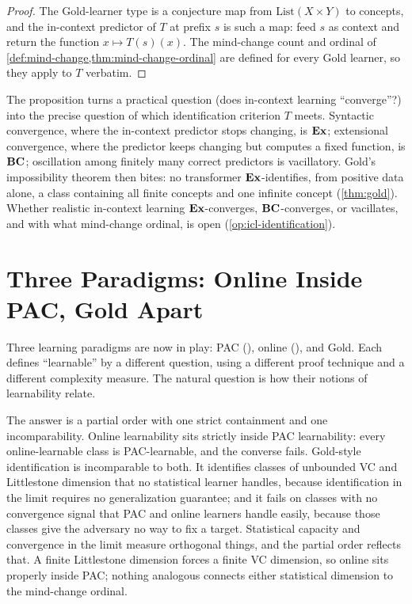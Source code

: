 \begin{proof}
The Gold-learner type is a conjecture map from $\mathrm{List}(X \times Y)$ to concepts, and the in-context predictor of $T$ at prefix $s$ is such a map: feed $s$ as context and return the function $x \mapsto T(s)(x)$.  The mind-change count and ordinal of \cref{def:mind-change,thm:mind-change-ordinal} are defined for every Gold learner, so they apply to $T$ verbatim.
\end{proof}

The proposition turns a practical question (does in-context learning ``converge''?) into the precise question of which identification criterion $T$ meets.  Syntactic convergence, where the in-context predictor stops changing, is $\mathbf{Ex}$; extensional convergence, where the predictor keeps changing but computes a fixed function, is $\mathbf{BC}$; oscillation among finitely many correct predictors is vacillatory.  Gold's impossibility theorem then bites: no transformer $\mathbf{Ex}$-identifies, from positive data alone, a class containing all finite concepts and one infinite concept (\cref{thm:gold}).  Whether realistic in-context learning $\mathbf{Ex}$-converges, $\mathbf{BC}$-converges, or vacillates, and with what mind-change ordinal, is open (\cref{op:icl-identification}).

\section{Three Paradigms: Online Inside PAC, Gold Apart}
\label{sec:three-paradigm}

Three learning paradigms are now in play: PAC (), online (), and Gold. Each defines ``learnable'' by a different question, using a different proof technique and a different complexity measure. The natural question is how their notions of learnability relate.

The answer is a partial order with one strict containment and one incomparability. Online learnability sits strictly inside PAC learnability: every online-learnable class is PAC-learnable, and the converse fails. Gold-style identification is incomparable to both. It identifies classes of unbounded VC and Littlestone dimension that no statistical learner handles, because identification in the limit requires no generalization guarantee; and it fails on classes with no convergence signal that PAC and online learners handle easily, because those classes give the adversary no way to fix a target. Statistical capacity and convergence in the limit measure orthogonal things, and the partial order reflects that. A finite Littlestone dimension forces a finite VC dimension, so online sits properly inside PAC; nothing analogous connects either statistical dimension to the mind-change ordinal.


